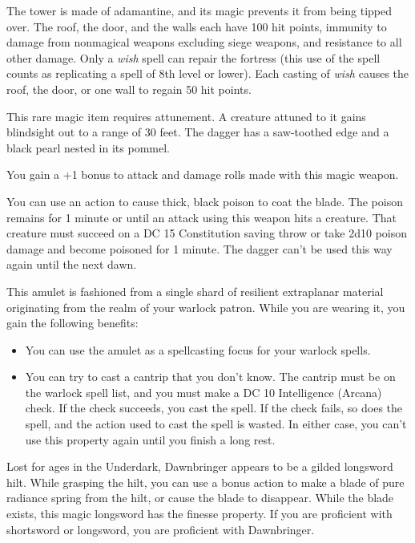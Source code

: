\documentclass[10pt,a4paper,twoside,bg=print,twocolumn,openany,nodeprecatedcode]{dndbook}
\begin{document}
The tower is made of adamantine, and its magic prevents it from being tipped over. The roof, the door, and the walls each have 100 hit points, immunity to damage from nonmagical weapons excluding siege weapons, and resistance to all other damage. Only a \textit{wish} spell can repair the fortress (this use of the spell counts as replicating a spell of 8th level or lower). Each casting of \textit{wish} causes the roof, the door, or one wall to regain 50 hit points.

This rare magic item requires attunement. A creature attuned to it gains blindsight out to a range of 30 feet. The dagger has a saw-toothed edge and a black pearl nested in its pommel.

You gain a +1 bonus to attack and damage rolls made with this magic weapon.

You can use an action to cause thick, black poison to coat the blade. The poison remains for 1 minute or until an attack using this weapon hits a creature. That creature must succeed on a DC 15 Constitution saving throw or take 2d10 poison damage and become poisoned for 1 minute. The dagger can't be used this way again until the next dawn.

This amulet is fashioned from a single shard of resilient extraplanar material originating from the realm of your warlock patron. While you are wearing it, you gain the following benefits:


\begin{itemize}
\item You can use the amulet as a spellcasting focus for your warlock spells.
\item You can try to cast a cantrip that you don't know. The cantrip must be on the warlock spell list, and you must make a DC 10 Intelligence (Arcana) check. If the check succeeds, you cast the spell. If the check fails, so does the spell, and the action used to cast the spell is wasted. In either case, you can't use this property again until you finish a long rest.
\end{itemize}

Lost for ages in the Underdark, Dawnbringer appears to be a gilded longsword hilt. While grasping the hilt, you can use a bonus action to make a blade of pure radiance spring from the hilt, or cause the blade to disappear. While the blade exists, this magic longsword has the finesse property. If you are proficient with shortsword or longsword, you are proficient with Dawnbringer.
\end{document}
